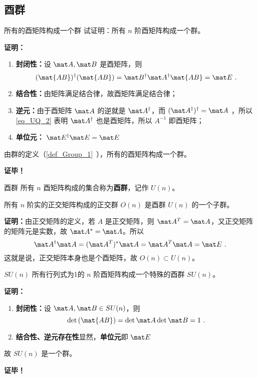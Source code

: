 \subsection{酉群}
\begin{example}{所有的酉矩阵构成一个群}
试证明：所有 $n$ 阶酉矩阵构成一个群。

\textbf{证明：}
\begin{enumerate}
\item \textbf{封闭性：}设 $\mat A,\mat B$ 是酉矩阵，则
\begin{equation}
(\mat{AB})^\dagger(\mat{AB})=\mat B^\dagger \mat A^\dagger\mat{AB}=\mat E~.
\end{equation}
\item \textbf{结合性：}由矩阵满足结合律，故酉矩阵满足结合律；
\item \textbf{逆元：}由于酉矩阵 $\mat A$ 的逆就是 $\mat A^\dagger$，而 $(\mat A^\dagger)^\dagger=\mat A$ ，所以\autoref{eq_UQ_2} 表明 $\mat A^\dagger$ 也是酉矩阵，所以 $A^{-1}$ 即酉矩阵；
\item \textbf{单位元：} $\mat E^\dagger\mat E=\mat E$
\end{enumerate}
由群的定义（\autoref{def_Group_1}~），所有的酉矩阵构成一个群。

\textbf{证毕！}
\end{example}
\begin{definition}{酉群}
所有 $n$ 酉矩阵构成的集合称为\textbf{酉群}，记作 $U(n)$。
\end{definition}
\begin{theorem}{}
所有 $n$ 阶实的正交矩阵构成的正交群 $O(n)$ 是酉群 $U(n)$ 的一个子群。
\end{theorem}
\textbf{证明：}由正交矩阵的定义，若 $A$ 是正交矩阵，则 $\mat A^T=\mat A$，又正交矩阵的矩阵元是实数，故 $\mat A^*=\mat A$。所以
\begin{equation}
\mat A^\dagger\mat A=(\mat A^T)^*\mat A=\mat A^T\mat A=\mat E~.
\end{equation}
这就是说，正交矩阵本身也是个酉矩阵，故 $O(n)\subset U(n)$。
\begin{theorem}{$SU(n)$}
所有行列式为1的 $n$ 阶酉矩阵构成一个特殊的酉群 $SU(n)$。
\end{theorem}
\textbf{证明：}
\begin{enumerate}
\item \textbf{封闭性：}设 $\mat A,\mat B\in SU(n)$，则
\begin{equation}
\det{(\mat{AB})}=\det{\mat A}\det{\mat B}=1~.
\end{equation}
\item \textbf{结合性、逆元存在性}显然，\textbf{单位元}即 $\mat E$
\end{enumerate}
故 $SU(n)$ 是一个群。

\textbf{证毕！}